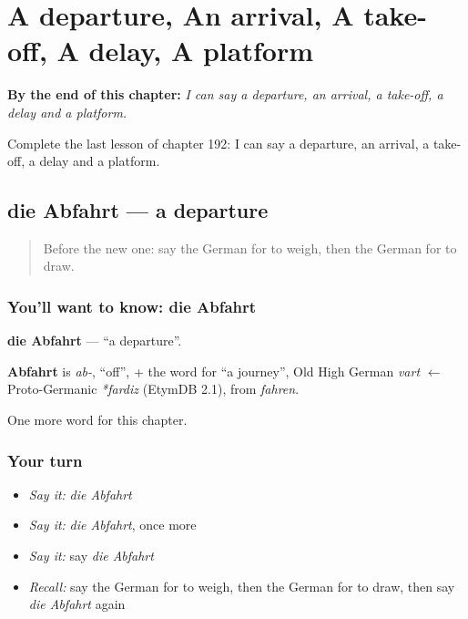 
\chapter{A departure, An arrival, A take-off, A delay, A platform}
\label{ch:ge-a-departure-an-arrival-a-take-off-a-delay-a-platform}

\begin{chapteropening}
\textbf{By the end of this chapter:} \emph{I can say a departure, an arrival, a take-off, a delay and a platform.}

Complete the last lesson of chapter 192: I can say a departure, an arrival, a take-off, a delay and a platform.
\end{chapteropening}

\section[die Abfahrt]{die Abfahrt — a departure}

\label{lesson:GE-C192-abfahrt}



\begin{quote}
Before the new one: say the German for to weigh, then the German for to draw.
\end{quote}

\subsection*{You'll want to know: die Abfahrt}
\textbf{die Abfahrt} — \textquotedblleft{}a departure\textquotedblright{}.

\begin{cousinweb}
\textbf{Abfahrt} is \emph{ab-}, \textquotedblleft{}off\textquotedblright{}, + the word for \textquotedblleft{}a journey\textquotedblright{}, Old High German \emph{vart} $\leftarrow$ Proto-Germanic \emph{*fardiz} (EtymDB 2.1), from \emph{fahren}.
\end{cousinweb}

\begin{grammarlens}[title={What you've built}]
One more word for this chapter.
\end{grammarlens}

\subsection*{Your turn}
\begin{itemize}
\raggedright
  \item \emph{Say it:} \emph{die Abfahrt}
  \item \emph{Say it:} \emph{die Abfahrt}, once more
  \item \emph{Say it:} say \emph{die Abfahrt}
  \item \emph{Recall:} say the German for to weigh, then the German for to draw, then say \emph{die Abfahrt} again
\end{itemize}

